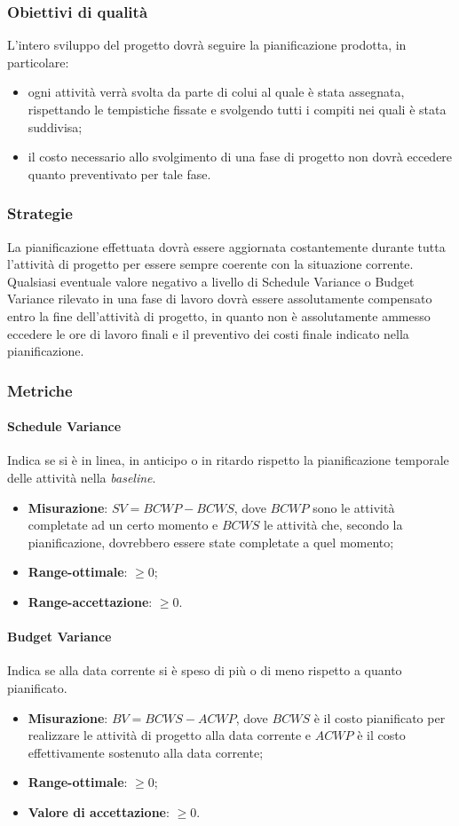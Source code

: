 \subsubsection{Obiettivi di qualità}
L'intero sviluppo del progetto dovrà seguire la pianificazione prodotta, in particolare:
\begin{itemize}
\item ogni attività verrà svolta da parte di colui al quale è stata assegnata, rispettando le tempistiche fissate e svolgendo tutti i compiti nei quali è stata suddivisa;
\item il costo necessario allo svolgimento di una fase di progetto non dovrà eccedere quanto preventivato per tale fase.
\end{itemize}
\subsubsection{Strategie}
La pianificazione effettuata dovrà essere aggiornata costantemente durante tutta l'attività di progetto per essere sempre coerente con la situazione corrente. Qualsiasi eventuale valore negativo a livello di Schedule Variance o  Budget Variance rilevato in una fase di lavoro dovrà essere assolutamente compensato entro la fine dell'attività di progetto, in quanto non è assolutamente ammesso eccedere le ore di lavoro finali e il preventivo dei costi finale indicato nella pianificazione.
\subsubsection{Metriche}
\paragraph{Schedule Variance}
Indica se si è in linea, in anticipo o in ritardo rispetto la pianificazione temporale delle attività nella \textit{baseline}.
\begin{itemize}
\item \textbf{Misurazione}: $SV = BCWP - BCWS$, dove $BCWP$ sono le attività completate ad un certo momento e $BCWS$ le attività che, secondo la pianificazione, dovrebbero essere state completate a quel momento;
\item \textbf{Range-ottimale}: $\geq 0$;
\item \textbf{Range-accettazione}: $\geq 0$.
\end{itemize}
\paragraph{Budget Variance}
Indica se alla data corrente si è speso di più o di meno rispetto a quanto pianificato.
\begin{itemize}
\item \textbf{Misurazione}: $BV = BCWS - ACWP$, dove $BCWS$ è il costo pianificato per realizzare le attività di progetto alla data corrente e $ACWP$ è il costo effettivamente sostenuto alla data corrente;
\item \textbf{Range-ottimale}: $\geq 0$;
\item \textbf{Valore di accettazione}: $\geq 0$.
\end{itemize}

